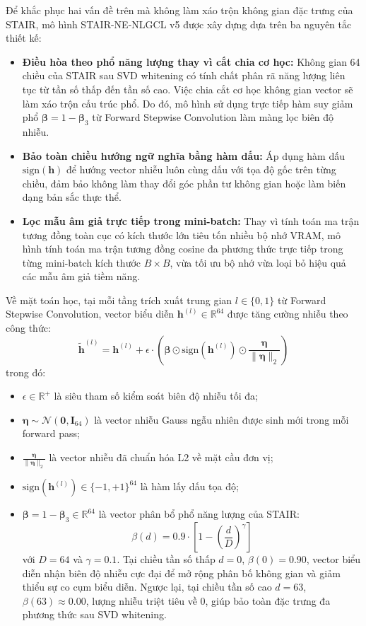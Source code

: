 Để khắc phục hai vấn đề trên mà không làm xáo trộn không gian đặc trưng của STAIR, mô hình STAIR-NE-NLGCL v5 được xây dựng dựa trên ba nguyên tắc thiết kế:
\begin{itemize}
    \item \textbf{Điều hòa theo phổ năng lượng thay vì cắt chia cơ học:} Không gian 64 chiều của STAIR sau SVD whitening có tính chất phân rã năng lượng liên tục từ tần số thấp đến tần số cao. Việc chia cắt cơ học không gian vector sẽ làm xáo trộn cấu trúc phổ. Do đó, mô hình sử dụng trực tiếp hàm suy giảm phổ $\boldsymbol{\beta} = 1 - \boldsymbol{\beta}_3$ từ Forward Stepwise Convolution làm màng lọc biên độ nhiễu.
    \item \textbf{Bảo toàn chiều hướng ngữ nghĩa bằng hàm dấu:} Áp dụng hàm dấu $\text{sign}(\mathbf{h})$ để hướng vector nhiễu luôn cùng dấu với tọa độ gốc trên từng chiều, đảm bảo không làm thay đổi góc phần tư không gian hoặc làm biến dạng bản sắc thực thể.
    \item \textbf{Lọc mẫu âm giả trực tiếp trong mini-batch:} Thay vì tính toán ma trận tương đồng toàn cục có kích thước lớn tiêu tốn nhiều bộ nhớ VRAM, mô hình tính toán ma trận tương đồng cosine đa phương thức trực tiếp trong từng mini-batch kích thước $B \times B$, vừa tối ưu bộ nhớ vừa loại bỏ hiệu quả các mẫu âm giả tiềm năng.
\end{itemize}

Về mặt toán học, tại mỗi tầng trích xuất trung gian $l \in \{0, 1\}$ từ Forward Stepwise Convolution, vector biểu diễn $\mathbf{h}^{(l)} \in \mathbb{R}^{64}$ được tăng cường nhiễu theo công thức:
\begin{equation}
\tilde{\mathbf{h}}^{(l)} = \mathbf{h}^{(l)} + \epsilon \cdot \left( \boldsymbol{\beta} \odot \text{sign}(\mathbf{h}^{(l)}) \odot \frac{\boldsymbol{\eta}}{\|\boldsymbol{\eta}\|_2} \right)
\end{equation}
trong đó:
\begin{itemize}
    \item $\epsilon \in \mathbb{R}^+$ là siêu tham số kiểm soát biên độ nhiễu tối đa;
    \item $\boldsymbol{\eta} \sim \mathcal{N}(\mathbf{0}, \mathbf{I}_{64})$ là vector nhiễu Gauss ngẫu nhiên được sinh mới trong mỗi forward pass;
    \item $\frac{\boldsymbol{\eta}}{\|\boldsymbol{\eta}\|_2}$ là vector nhiễu đã chuẩn hóa L2 về mặt cầu đơn vị;
    \item $\text{sign}(\mathbf{h}^{(l)}) \in \{-1, +1\}^{64}$ là hàm lấy dấu tọa độ;
    \item $\boldsymbol{\beta} = 1 - \boldsymbol{\beta}_3 \in \mathbb{R}^{64}$ là vector phân bổ phổ năng lượng của STAIR:
    \begin{equation}
    \beta(d) = 0.9 \cdot \left[ 1 - \left(\frac{d}{D}\right)^\gamma \right]
    \end{equation}
    với $D = 64$ và $\gamma = 0.1$. Tại chiều tần số thấp $d = 0$, $\beta(0) = 0.90$, vector biểu diễn nhận biên độ nhiễu cực đại để mở rộng phân bố không gian và giảm thiểu sự co cụm biểu diễn. Ngược lại, tại chiều tần số cao $d = 63$, $\beta(63) \approx 0.00$, lượng nhiễu triệt tiêu về 0, giúp bảo toàn đặc trưng đa phương thức sau SVD whitening.
\end{itemize}

